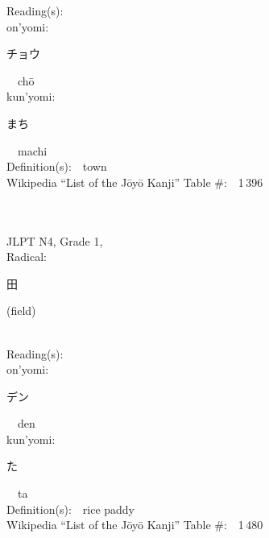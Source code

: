 \begin{multicols}{2}
Reading(s):\ \ \\
{\hspace*{1em}}on'yomi:\ \ \\
{\hspace*{2em}}{\begin{CJK}{UTF8}{min} チョウ \end{CJK}}\ \ ch\=o\ \ \\
{\hspace*{1em}}kun'yomi:\ \ \\
{\hspace*{2em}}{\begin{CJK}{UTF8}{min} まち \end{CJK}}\ \ machi\ \ \\
Definition(s):\ \ town \\
Wikipedia ``List of the J\=oy\=o Kanji'' Table \#:\ \ 1\,396 \\
\ \ \\
{\fontsize{34pt}{40pt}  }\ \ \\  %
{JLPT N4, Grade 1, \\Radical:\ \ {\begin{CJK}{UTF8}{min} 田 \end{CJK}} (field) } \\
Reading(s):\ \ \\
{\hspace*{1em}}on'yomi:\ \ \\
{\hspace*{2em}}{\begin{CJK}{UTF8}{min} デン \end{CJK}}\ \ den\ \ \\
{\hspace*{1em}}kun'yomi:\ \ \\
{\hspace*{2em}}{\begin{CJK}{UTF8}{min} た \end{CJK}}\ \ ta\ \ \\
Definition(s):\ \ rice paddy \\
Wikipedia ``List of the J\=oy\=o Kanji'' Table \#:\ \ 1\,480 \\
\ \ \\
{\fontsize{34pt}{40pt}  }\ \ \\  %

\end{multicols}
